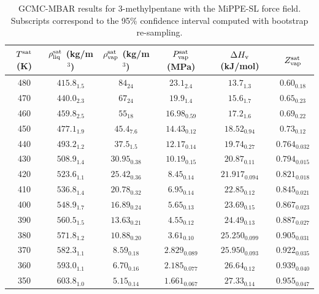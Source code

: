 \documentclass[journal=jctc,manuscript=article]{achemso}
\begin{document}
\begin{table}[htb!]
	\caption{GCMC-MBAR results for 3-methylpentane with the MiPPE-SL force field. Subscripts correspond to the 95\% confidence interval computed with bootstrap re-sampling.}
	\begin{center}
		\begin{tabular}{|c|c|c|c|c|c|}
			\hline
			$T^{\rm sat}$ (K) & $\rho_{\rm liq}^{\rm sat}$ (kg/m$^3$) & $\rho_{\rm vap}^{\rm sat}$ (kg/m$^3$) & $P_{\rm vap}^{\rm sat}$ (MPa) & $\Delta H_{\rm v}$ (kJ/mol) & $Z_{\rm vap}^{\rm sat}$ \\ \hline
			480 & $415.8_{1.5}$ & $84_{24}$ & $23.1_{2.4}$ & $13.7_{1.3}$ & $0.60_{0.18}$ \\
			470 & $440.0_{2.3}$ & $67_{24}$ & $19.9_{1.4}$ & $15.6_{1.7}$ & $0.65_{0.23}$ \\
			460 & $459.8_{2.5}$ & $55_{18}$ & $16.98_{0.59}$ & $17.2_{1.6}$ & $0.69_{0.22}$ \\
			450 & $477.1_{1.9}$ & $45.4_{7.6}$ & $14.43_{0.12}$ & $18.52_{0.94}$ & $0.73_{0.12}$ \\
			440 & $493.2_{1.2}$ & $37.5_{1.5}$ & $12.17_{0.14}$ & $19.74_{0.27}$ & $0.764_{0.032}$ \\
			430 & $508.9_{1.4}$ & $30.95_{0.38}$ & $10.19_{0.15}$ & $20.87_{0.11}$ & $0.794_{0.015}$ \\
			420 & $523.6_{1.1}$ & $25.42_{0.36}$ & $8.45_{0.14}$ & $21.917_{0.094}$ & $0.821_{0.018}$ \\
			410 & $536.8_{1.4}$ & $20.78_{0.32}$ & $6.95_{0.14}$ & $22.85_{0.12}$ & $0.845_{0.021}$ \\
			400 & $548.9_{1.7}$ & $16.89_{0.24}$ & $5.65_{0.13}$ & $23.69_{0.15}$ & $0.867_{0.023}$ \\
			390 & $560.5_{1.5}$ & $13.63_{0.21}$ & $4.55_{0.12}$ & $24.49_{0.13}$ & $0.887_{0.027}$ \\
			380 & $571.8_{1.2}$ & $10.88_{0.20}$ & $3.61_{0.10}$ & $25.250_{0.099}$ & $0.905_{0.031}$ \\
			370 & $582.3_{1.1}$ & $8.59_{0.18}$ & $2.829_{0.089}$ & $25.950_{0.093}$ & $0.922_{0.035}$ \\
			360 & $593.0_{1.1}$ & $6.70_{0.16}$ & $2.185_{0.077}$ & $26.64_{0.12}$ & $0.939_{0.040}$ \\
			350 & $603.8_{1.0}$ & $5.15_{0.14}$ & $1.661_{0.067}$ & $27.33_{0.14}$ & $0.955_{0.047}$ \\
			\hline
		\end{tabular}
	\end{center}
\end{table}
\end{document}
